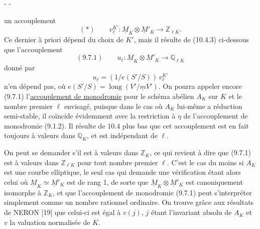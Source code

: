 \begin{center}-  -\end{center}

un accouplement
\[
(*)\qquad v_\ell^{K'}:\underline M_K\otimes\underline M'_K\longrightarrow\mathbb Z_{\ell K}.
\]
Ce dernier à priori dépend du choix de $K'$, mais il résulte de (10.4.3) ci-dessous que l'accouplement
\[
(9.7.1)\qquad u_\ell:\underline M_K\otimes\underline M'_K\longrightarrow\mathbb Q_{\ell K}
\]
donné par
\[
u_\ell=(1/e(S'/S))\,v_\ell^{K'}
\]
n'en dépend pas, où $e(S'/S)=\operatorname{long}(V'/\underline mV')$. On pourra appeler encore (9.7.1) l'\uline{accouplement de monodromie} pour le schéma abélien $A_K$ sur $K$ et le nombre premier $\ell$ envisagé, puisque dans le cas où $A_K$ lui-même a réduction semi-stable, il coïncide évidemment avec la restriction à $\eta$ de l'accouplement de monodromie (9.1.2). Il résulte de 10.4 plus bas que cet accouplement est en fait toujours à valeurs dans $\mathbb Q_K$, et est indépendant de $\ell$.

On peut se demander s'il est à valeurs dans $\mathbb Z_K$, ce qui revient à dire que (9.7.1) est à valeurs dans $\mathbb Z_{\ell K}$ pour tout nombre premier $\ell$. C'est le cas du moins si $A_K$ est une courbe elliptique, le seul cas qui demande une vérification étant alors celui où $\underline M_K\simeq\underline M'_K$ est de rang 1, de sorte que $\underline M_K\otimes\underline M'_K$ est canoniquement isomorphe à $\mathbb Z_K$, et que l'accouplement de monodromie (9.7.1) peut s'interpréter simplement comme un nombre rationnel ordinaire. On trouve grâce aux résultats de NERON [19] que celui-ci est égal à $v(j)$, $j$ étant l'invariant absolu de $A_K$ et $v$ la valuation normalisée de $K$.

